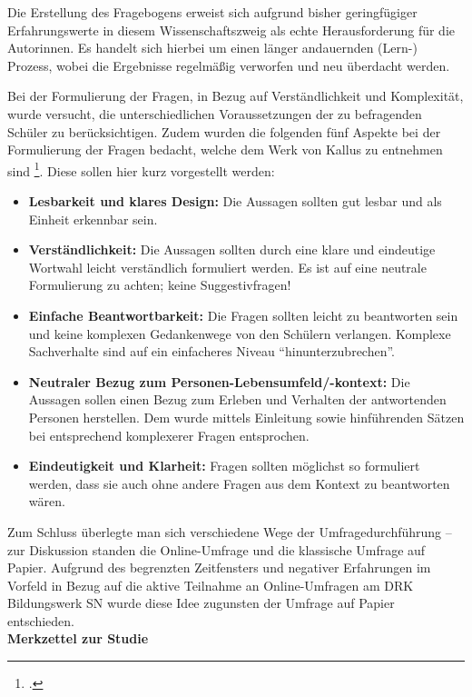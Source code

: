Die Erstellung des Fragebogens erweist sich aufgrund bisher geringfügiger Erfahrungswerte in diesem Wissenschaftszweig als echte Herausforderung für die Autorinnen. Es handelt sich hierbei um einen länger andauernden (Lern-) Prozess, wobei die Ergebnisse regelmäßig verworfen und neu überdacht werden.
 
Bei der Formulierung der Fragen, in Bezug auf Verständlichkeit und Komplexität, wurde versucht, die unterschiedlichen Voraussetzungen der zu befragenden Schüler zu berücksichtigen. Zudem wurden die folgenden fünf Aspekte bei der Formulierung der Fragen bedacht, welche dem Werk von Kallus zu entnehmen sind \footcite[vgl.][63-66]{Kallus2010}. Diese sollen hier kurz vorgestellt werden:

\begin{itemize}
	\item \textbf{Lesbarkeit und klares Design:} Die Aussagen sollten gut lesbar und als Einheit erkennbar sein. 
	\item \textbf{Verständlichkeit:} Die Aussagen sollten durch eine klare und eindeutige Wortwahl leicht verständlich formuliert werden. Es ist auf eine neutrale Formulierung zu achten; keine Suggestivfragen!
	\item \textbf{Einfache Beantwortbarkeit:} Die Fragen sollten leicht zu beantworten sein und keine komplexen Gedankenwege von den Schülern verlangen. Komplexe Sachverhalte sind auf ein einfacheres Niveau "`hinunterzubrechen"'.
	\item \textbf{Neutraler Bezug zum Personen-Lebensumfeld/-kontext:} Die Aussagen sollen einen Bezug zum Erleben und Verhalten der antwortenden Personen herstellen. Dem wurde mittels Einleitung sowie hinführenden Sätzen bei entsprechend komplexerer Fragen entsprochen.
	\item \textbf{Eindeutigkeit und Klarheit:} Fragen sollten möglichst so formuliert werden, dass sie auch ohne andere Fragen aus dem Kontext zu beantworten wären.
\end{itemize}

\noindent
Zum Schluss überlegte man sich verschiedene Wege der Umfragedurchführung -- zur Diskussion standen die Online-Umfrage und die klassische Umfrage auf Papier. Aufgrund des begrenzten Zeitfensters und negativer Erfahrungen im Vorfeld in Bezug auf die aktive Teilnahme an Online-Umfragen am DRK Bildungswerk SN wurde diese Idee zugunsten der Umfrage auf Papier entschieden.\\

\noindent
\textbf{Merkzettel zur Studie}\\

